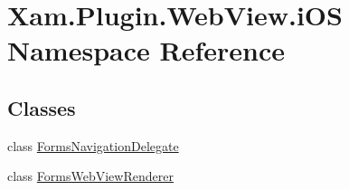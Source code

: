 \hypertarget{namespace_xam_1_1_plugin_1_1_web_view_1_1i_o_s}{}\section{Xam.\+Plugin.\+Web\+View.\+i\+OS Namespace Reference}
\label{namespace_xam_1_1_plugin_1_1_web_view_1_1i_o_s}
\subsection*{Classes}
\begin{DoxyCompactItemize}
\item 
class \hyperlink{class_xam_1_1_plugin_1_1_web_view_1_1i_o_s_1_1_forms_navigation_delegate}{Forms\+Navigation\+Delegate}
\item 
class \hyperlink{class_xam_1_1_plugin_1_1_web_view_1_1i_o_s_1_1_forms_web_view_renderer}{Forms\+Web\+View\+Renderer}
\end{DoxyCompactItemize}
